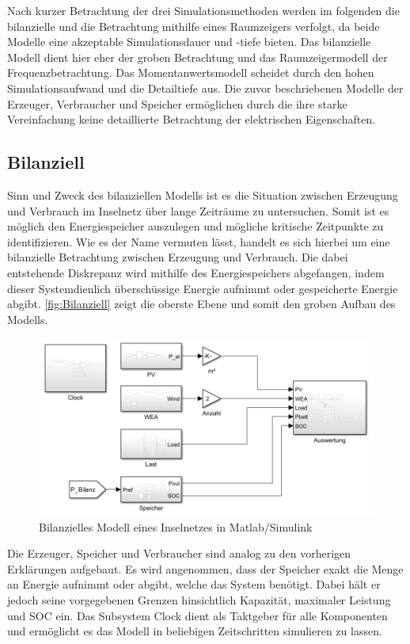 Nach kurzer Betrachtung der drei Simulationsmethoden werden im folgenden die bilanzielle und die Betrachtung mithilfe eines Raumzeigers verfolgt, da beide Modelle eine akzeptable Simulationsdauer und -tiefe bieten. Das bilanzielle Modell dient hier eher der groben Betrachtung und das Raumzeigermodell der Frequenzbetrachtung. Das Momentanwertsmodell scheidet durch den hohen Simulationsaufwand und die Detailtiefe aus. Die zuvor beschriebenen Modelle der Erzeuger, Verbraucher und Speicher ermöglichen durch die ihre starke Vereinfachung keine detaillierte Betrachtung der elektrischen Eigenschaften.

\subsection{Bilanziell}

Sinn und Zweck des bilanziellen Modells ist es die Situation zwischen Erzeugung und Verbrauch im Inselnetz über lange Zeiträume zu untersuchen. Somit ist es möglich den Energiespeicher auszulegen und mögliche kritische Zeitpunkte zu identifizieren. Wie es der Name vermuten lässt, handelt es sich hierbei um eine bilanzielle Betrachtung zwischen Erzeugung und Verbrauch. Die dabei entstehende Diskrepanz wird mithilfe des Energiespeichers abgefangen, indem dieser Systemdienlich überschüssige Energie aufnimmt oder gespeicherte Energie abgibt. \autoref{fig:Bilanziell} zeigt die oberste Ebene und somit den groben Aufbau des Modells.

\begin{figure}[H]
	\centering
	\includegraphics[width=0.9\linewidth]{Abbildungen/Bilanziell.png}
	\caption{Bilanzielles Modell eines Inselnetzes in Matlab/Simulink}
	\label{fig:Bilanziell}
\end{figure}

Die Erzeuger, Speicher und Verbraucher sind analog zu den vorherigen Erklärungen aufgebaut. Es wird angenommen, dass der Speicher exakt die Menge an Energie aufnimmt oder abgibt, welche das System benötigt. Dabei hält er jedoch seine vorgegebenen Grenzen hinsichtlich Kapazität, maximaler Leistung und SOC ein. Das Subsystem Clock dient als Taktgeber für alle Komponenten und ermöglicht es das Modell in beliebigen Zeitschritten simulieren zu lassen. 

